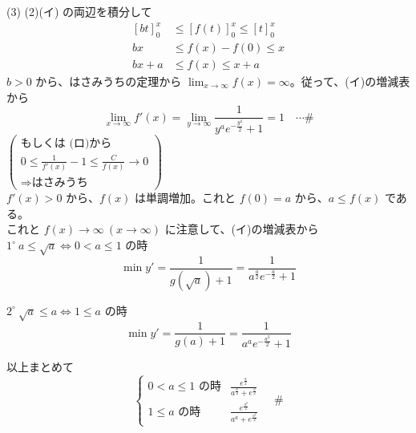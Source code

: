 \documentclass[../main.tex]{subfiles}
\begin{document}
(3) (2)(イ) の両辺を積分して
\begin{align*}
  \left[ bt \right]_0^x &\le \left[ f(t) \right]_0^x \le \left[ t \right]_0^x \\
  bx &\le f(x) - f(0) \le x \\
  bx + a &\le f(x) \le x + a
\end{align*}
$b>0$ から、はさみうちの定理から $\lim_{x \to \infty} f(x) = \infty$。従って、(イ)の増減表から
\[ \lim_{x \to \infty} f'(x) = \lim_{y \to \infty} \frac{1}{y^a e^{-\frac{y^2}{2}} + 1} = 1 \quad \cdots \# \]
$\left(
  \begin{array}{l} \text{もしくは (ロ)から} \\ 0 \le \frac{1}{f'(x)} - 1 \le \frac{C}{f(x)} \to 0 \\ \Rightarrow \text{はさみうち}
\end{array} \right)$ \\
$f'(x) > 0$ から、$f(x)$ は単調増加。これと $f(0) = a$ から、$a \le f(x)$ である。 \\
これと $f(x) \to \infty\ (x \to \infty)$ に注意して、(イ)の増減表から \\

$1^\circ \ a \le \sqrt{a} \Leftrightarrow 0 < a \le 1$ の時
\[ \min y' = \frac{1}{g(\sqrt{a}) + 1} = \frac{1}{a^{\frac{a}{2}} e^{-\frac{a}{2}} + 1} \]

$2^\circ \ \sqrt{a} \le a \Leftrightarrow 1 \le a$ の時
\[ \min y' = \frac{1}{g(a) + 1} = \frac{1}{a^a e^{-\frac{a^2}{2}} + 1} \]

以上まとめて
\[
  \begin{cases}
    0 < a \le 1 \text{ の時} & \frac{e^{\frac{a}{2}}}{a^{\frac{a}{2}} + e^{\frac{a}{2}}} \\
    1 \le a \text{ の時} & \frac{e^{\frac{a^2}{2}}}{a^a + e^{\frac{a^2}{2}}}
  \end{cases} \quad \#
\]
\end{document}
